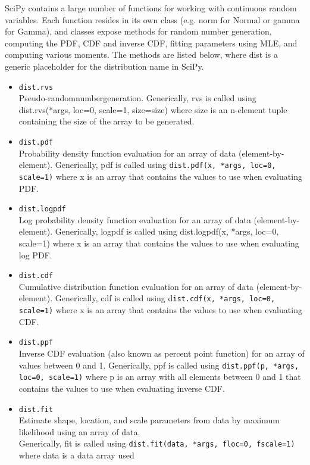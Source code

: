 \documentclass[Pydata.tex]{subfiles}
\begin{document}
SciPy contains a large number of functions for working with continuous random variables. Each function
resides in its own class (e.g. norm for Normal or gamma for Gamma), and classes expose methods for random
number generation, computing the PDF, CDF and inverse CDF, fitting parameters using MLE, and
computing various moments. The methods are listed below, where dist is a generic placeholder for the
distribution name in SciPy. 
\begin{itemize} 
	\item \texttt{dist.rvs}\\
	Pseudo-randomnumbergeneration. Generically, rvs is called using dist.rvs(*args, loc=0, scale=1, size=size)
	where size is an n-element tuple containing the size of the array to be generated.
	\item \texttt{dist.pdf}\\
	Probability density function evaluation for an array of data (element-by-element). Generically, pdf is
	called using \texttt{dist.pdf(x, *args, loc=0, scale=1)} where x is an array that contains the values to use when
	evaluating PDF.
	\item \texttt{dist.logpdf}\\
	Log probability density function evaluation for an array of data (element-by-element). Generically, logpdf
	is called using dist.logpdf(x, *args, loc=0, scale=1) where x is an array that contains the values to use
	when evaluating log PDF.
	\item \texttt{dist.cdf}\\
	Cumulative distribution function evaluation for an array of data (element-by-element). Generically, cdf
	is called using d\texttt{ist.cdf(x, *args, loc=0, scale=1)} where x is an array that contains the values to use
	when evaluating CDF.
	\item \texttt{dist.ppf}\\
	Inverse CDF evaluation (also known as percent point function) for an array of values between 0 and 1.
	Generically, ppf is called using \texttt{dist.ppf(p, *args, loc=0, scale=1)} where p is an array with all elements
	between 0 and 1 that contains the values to use when evaluating inverse CDF.
	\item \texttt{dist.fit}\\
	Estimate shape, location, and scale parameters from data by maximum likelihood using an array of data.
	\\ Generically, fit is called using \texttt{dist.fit(data, *args, floc=0, fscale=1)} where data is a data array used

\end{itemize}
\end{document}
